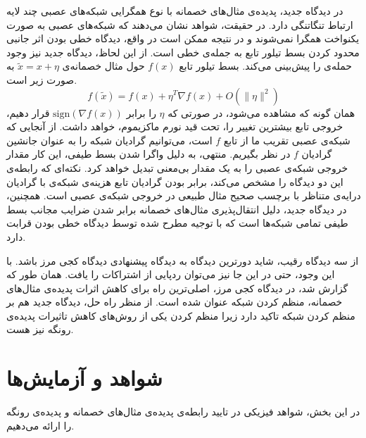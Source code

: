 \documentclass[12pt,onecolumn,a4paper]{article}
\begin{document}
در دیدگاه جدید، پدیده‌ی مثال‌های خصمانه با نوع همگرایی شبکه‌های عصبی چند لایه ارتباط تنگاتنگی دارد. در حقیقت، شواهد نشان می‌دهند که شبکه‌های عصبی به صورت یکنواخت همگرا نمی‌شوند و در نتیجه ممکن است در واقع، دیدگاه خطی بودن اثر جانبی محدود کردن بسط تیلور تابع به جمله‌ی خطی است. از این لحاظ، دیدگاه جدید نیز وجود حمله‌ی
را پیش‌بینی می‌کند. بسط تیلور تابع $f(x)$ حول مثال خصمانه‌ی $\tilde{x}=x+\eta$ به صورت زیر است.
\begin{equation*}
f(\tilde{x})=f(x)+\eta^T\nabla f(x) + O(\|\eta\|^2)
\end{equation*}
همان گونه که مشاهده می‌شود، در صورتی که $\eta$ را برابر $\mathrm{sign}(\nabla f(x))$ قرار دهیم، خروجی تابع بیشترین تغییر را، تحت قید نورم ماکزیموم، خواهد داشت. از آنجایی که شبکه‌ی عصبی تقریب ما از تابع $f$ است، می‌توانیم گرادیان شبکه را به عنوان جانشین گرادیان $f$ در نظر بگیریم. منتهی، به دلیل واگرا شدن بسط طیفی، این کار مقدار خروجی شبکه‌ی عصبی را به یک مقدار بی‌معنی تبدیل خواهد کرد. نکته‌ای که رابطه‌ی این دو دیدگاه را مشخص می‌کند، برابر بودن گرادیان تابع هزینه‌ی شبکه‌ی  با گرادیان درایه‌ی متناظر با برچسب صحیح مثال طبیعی در خروجی شبکه‌ی عصبی است. همچنین، در دیدگاه جدید، دلیل انتقال‌پذیری مثال‌های خصمانه برابر شدن ضرایب مجانب بسط طیفی تمامی شبکه‌ها است که با توجیه مطرح شده توسط دیدگاه خطی بودن قرابت دارد.

از سه دیدگاه رقیب، شاید دورترین دیدگاه به دیدگاه پیشنهادی دیدگاه کجی مرز باشد. با این وجود، حتی در این جا نیز می‌توان ردپایی از اشتراکات را یافت. همان طور که گزارش شد، در دیدگاه کجی مرز، اصلی‌ترین راه برای کاهش اثرات پدیده‌ی مثال‌های خصمانه، منظم کردن شبکه عنوان شده است. از منظر راه حل، دیدگاه جدید هم بر منظم کردن شبکه تاکید دارد زیرا منظم کردن یکی از روش‌های کاهش تاثیرات پدیده‌ی رونگه نیز هست.

\section{شواهد و آزمایش‌ها}
در این بخش، شواهد فیزیکی در تایید رابطه‌ی پدیده‌ی مثال‌های خصمانه و پدیده‌ی رونگه را ارائه می‌دهیم.
\end{document}
